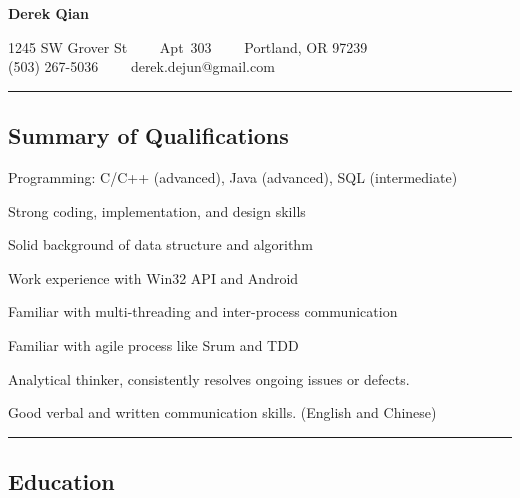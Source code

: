 \documentclass[10pt,letterpaper]{article}
\begin{document}
\begin{center}
{\LARGE \textbf{Derek Qian}}

1245 SW Grover St\ \ \textbullet
\ \ Apt\ 303\ \ \textbullet
\ \ Portland, OR 97239
\\
(503) 267-5036\ \ \textbullet
\ \ derek.dejun@gmail.com
\end{center}


\hrule
\vspace{-0.4em}
\subsection*{Summary of Qualifications}
\begin{itemize*}
	\item Programming: C/C++ (advanced), Java (advanced), SQL (intermediate)
	\item Strong coding, implementation, and design skills
	\item Solid background of data structure and algorithm
	\item Work experience with Win32 API and Android
        \item Familiar with multi-threading and inter-process communication
	\item Familiar with agile process like Srum and TDD
	\item Analytical thinker, consistently resolves ongoing issues or defects.
	\item Good verbal and written communication skills. (English and Chinese)
\end{itemize*}

\hrule
\vspace{-0.4em}
\subsection*{Education}
\end{document}
